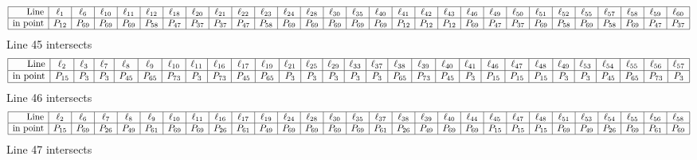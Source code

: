 \documentclass{article}
\begin{document}
{$$
\begin{array}{|r*{28}{|c}|}
\hline
\mbox{Line}  & \ell_{1} & \ell_{6} & \ell_{10} & \ell_{11} & \ell_{12} & \ell_{18} & \ell_{20} & \ell_{21} & \ell_{22} & \ell_{23} & \ell_{24} & \ell_{28} & \ell_{30} & \ell_{35} & \ell_{40} & \ell_{41} & \ell_{42} & \ell_{43} & \ell_{46} & \ell_{49} & \ell_{50} & \ell_{51} & \ell_{52} & \ell_{55} & \ell_{57} & \ell_{58} & \ell_{59} & \ell_{60}\\
\hline
\mbox{in point}  & P_{12} & P_{69} & P_{69} & P_{69} & P_{58} & P_{47} & P_{37} & P_{37} & P_{47} & P_{58} & P_{69} & P_{69} & P_{69} & P_{69} & P_{69} & P_{12} & P_{12} & P_{12} & P_{69} & P_{47} & P_{37} & P_{69} & P_{58} & P_{69} & P_{58} & P_{69} & P_{47} & P_{37}\\
\hline
\end{array}
$$
Line 45 intersects 
$$
\begin{array}{|r*{28}{|c}|}
\hline
\mbox{Line}  & \ell_{2} & \ell_{3} & \ell_{7} & \ell_{8} & \ell_{9} & \ell_{10} & \ell_{11} & \ell_{16} & \ell_{17} & \ell_{19} & \ell_{21} & \ell_{25} & \ell_{29} & \ell_{33} & \ell_{37} & \ell_{38} & \ell_{39} & \ell_{40} & \ell_{41} & \ell_{46} & \ell_{47} & \ell_{48} & \ell_{49} & \ell_{53} & \ell_{54} & \ell_{55} & \ell_{56} & \ell_{57}\\
\hline
\mbox{in point}  & P_{15} & P_{3} & P_{3} & P_{45} & P_{65} & P_{73} & P_{3} & P_{73} & P_{45} & P_{65} & P_{3} & P_{3} & P_{3} & P_{3} & P_{3} & P_{65} & P_{73} & P_{45} & P_{3} & P_{15} & P_{15} & P_{15} & P_{3} & P_{3} & P_{45} & P_{65} & P_{73} & P_{3}\\
\hline
\end{array}
$$
Line 46 intersects 
$$
\begin{array}{|r*{28}{|c}|}
\hline
\mbox{Line}  & \ell_{2} & \ell_{6} & \ell_{7} & \ell_{8} & \ell_{9} & \ell_{10} & \ell_{11} & \ell_{16} & \ell_{17} & \ell_{19} & \ell_{24} & \ell_{28} & \ell_{30} & \ell_{35} & \ell_{37} & \ell_{38} & \ell_{39} & \ell_{40} & \ell_{44} & \ell_{45} & \ell_{47} & \ell_{48} & \ell_{51} & \ell_{53} & \ell_{54} & \ell_{55} & \ell_{56} & \ell_{58}\\
\hline
\mbox{in point}  & P_{15} & P_{69} & P_{26} & P_{49} & P_{61} & P_{69} & P_{69} & P_{26} & P_{61} & P_{49} & P_{69} & P_{69} & P_{69} & P_{69} & P_{61} & P_{26} & P_{49} & P_{69} & P_{69} & P_{15} & P_{15} & P_{15} & P_{69} & P_{49} & P_{26} & P_{69} & P_{61} & P_{69}\\
\hline
\end{array}
$$
Line 47 intersects 
$$
\begin{array}{|r*{28}{|c}|}

\end{array}$$}
\end{document}
